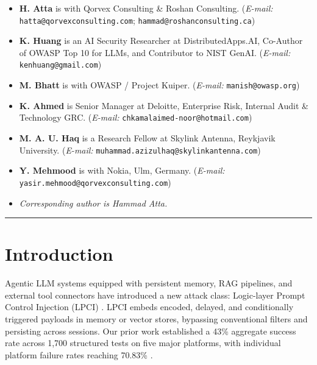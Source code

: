 \documentclass[10pt,twocolumn]{article}
\begin{document}
\begin{itemize}[leftmargin=*,topsep=2pt,itemsep=3pt,parsep=0pt,label={\tiny$\bullet$}]
\small
  \item \textbf{H. Atta} is with Qorvex Consulting \& Roshan Consulting.
        (\textit{E-mail:} \texttt{hatta@qorvexconsulting.com};
        \texttt{hammad@roshanconsulting.ca})
  \item \textbf{K. Huang} is an AI Security Researcher at DistributedApps.AI,
        Co-Author of OWASP Top 10 for LLMs, and Contributor to NIST GenAI.
        (\textit{E-mail:} \texttt{kenhuang@gmail.com})
  \item \textbf{M. Bhatt} is with OWASP / Project Kuiper.
        (\textit{E-mail:} \texttt{manish@owasp.org})
  \item \textbf{K. Ahmed} is Senior Manager at Deloitte, Enterprise Risk,
        Internal Audit \& Technology GRC.
        (\textit{E-mail:} \texttt{chkamalaimed-noor@hotmail.com})
  \item \textbf{M. A. U. Haq} is a Research Fellow at Skylink Antenna,
        Reykjavik University.
        (\textit{E-mail:} \texttt{muhammad.azizulhaq@skylinkantenna.com})
  \item \textbf{Y. Mehmood} is with Nokia, Ulm, Germany.
        (\textit{E-mail:} \texttt{yasir.mehmood@qorvexconsulting.com})
  \item \textit{Corresponding author is Hammad Atta.}
\end{itemize}

\vspace{3pt}\rule{\columnwidth}{0.4pt}\vspace{3pt}

\section{Introduction}

Agentic LLM systems equipped with persistent memory, RAG pipelines, and
external tool connectors have introduced a new attack class: Logic-layer
Prompt Control Injection (LPCI) \cite{atta2025lpci}.  LPCI embeds encoded,
delayed, and conditionally triggered payloads in memory or vector stores,
bypassing conventional filters and persisting across sessions.  Our prior
work established a 43\% aggregate success rate across 1,700 structured tests
on five major platforms, with individual platform failure rates reaching
70.83\% \cite{atta2025lpci}.
\end{document}
